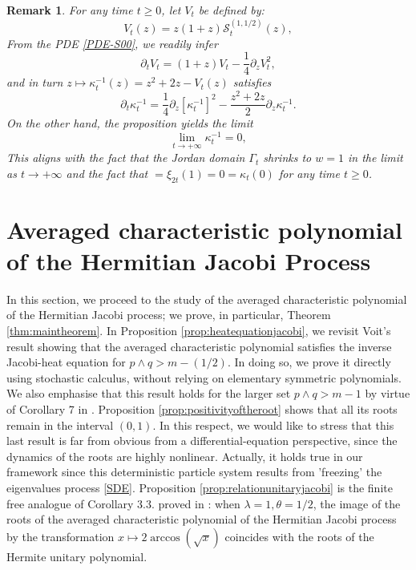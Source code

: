 \documentclass[12pt,reqno]{amsart}
\newtheorem{remark}{Remark}
\begin{document}
\begin{remark}
	For any time $t\geq 0$, let $V_t$ be defined by:
	\begin{equation*}
		V_t(z) = z(1+z) \mathcal{S}_t^{(1,1/2)}(z),
	\end{equation*}
	From the PDE \eqref{PDE-S00}, we readily infer
	\begin{equation*}
		\partial_t V_t = (1+z)V_t - \frac{1}{4}\partial_z V_t^2,
	\end{equation*}
	and in turn $z \mapsto \kappa_t^{-1}(z) = z^2 +2z -V_t(z)$ satisfies
	\begin{equation*}
		\partial_t\kappa_t^{-1} = \frac{1}{4}\partial_z [\kappa_t^{-1}]^2
		-\frac{z^2+2z}{2}\partial_z \kappa_t^{-1}.
	\end{equation*}
On the other hand, the proposition yields the limit
\begin{equation*}
 \lim_{t \rightarrow + \infty} \kappa_t^{-1} = 0,    
\end{equation*}
This aligns with the fact that the Jordan domain $\Gamma_t$ shrinks to $w=1$ in the limit as $t \rightarrow +\infty$ and the fact that $= \xi_{2t}(1) = 0 = \kappa_t(0)$ for any time $t \geq 0$.
\end{remark}

\section{Averaged characteristic polynomial of the Hermitian Jacobi Process}
\label{sec:averaged}
In this section, we proceed to the study of the averaged characteristic polynomial of the Hermitian Jacobi process; we prove, in particular, Theorem \ref{thm:maintheorem}. In Proposition \eqref{prop:heatequationjacobi}, we revisit Voit's result showing that the averaged characteristic polynomial satisfies the inverse Jacobi-heat equation for $p \wedge q > m-(1/2)$. 
In doing so, we prove it directly using stochastic calculus, without relying on elementary symmetric polynomials. We also emphasise that this result holds for the larger set $p \wedge q > m-1$ by virtue of Corollary 7 in \cite{MR3296535}. Proposition \ref{prop:positivityoftheroot}
shows that all its roots remain in the interval $(0,1)$. In this respect, we would like to stress that this last result is far from obvious from a differential-equation perspective, since the dynamics of the roots are highly nonlinear. Actually, it holds true in our framework since this deterministic particle system results from 'freezing' the eigenvalues process \eqref{SDE}.  Proposition \ref{prop:relationunitaryjacobi} is the finite free analogue of Corollary 3.3. proved in \cite{MR3071702}: when $\lambda =1, \theta=1/2$, the image of the roots of
the averaged characteristic polynomial of the Hermitian Jacobi process by the transformation $x \mapsto 2\arccos(\sqrt{x})$ coincides with the roots of the Hermite unitary polynomial.
\end{document}
